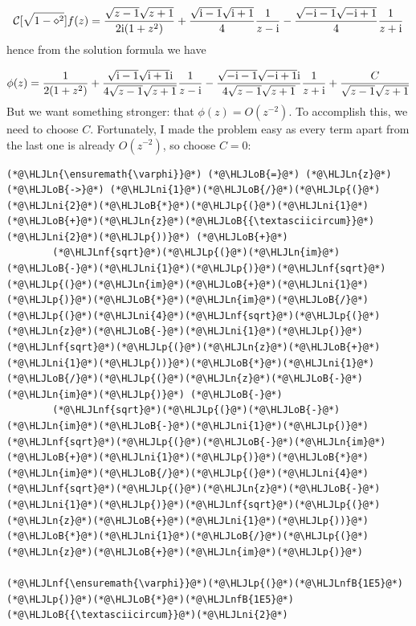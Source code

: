 \documentclass[12pt,a4paper]{article}
\newcommand{\HLJLn}[1]{#1}
\newcommand{\HLJLnf}[1]{\textcolor[RGB]{66,102,213}{#1}}
\newcommand{\HLJLnfB}[1]{\textcolor[RGB]{59,151,46}{#1}}
\newcommand{\HLJLni}[1]{\textcolor[RGB]{59,151,46}{#1}}
\newcommand{\HLJLoB}[1]{\textcolor[RGB]{102,102,102}{\textbf{#1}}}
\newcommand{\HLJLp}[1]{#1}
\def\I{ {\rm i} }
\def\CC{ {\cal C} }
\begin{document}
\[
\CC[\sqrt{1-\diamond^2}] f(z) = {\sqrt{z-1} \sqrt{z+1}  \over 2\I(1 + z^2)}  + {\sqrt{\I -1} \sqrt{\I+1} \over 4} { 1 \over z - \I} - {\sqrt{-\I -1} \sqrt{-\I+1} \over 4} { 1 \over z + \I}
\]
hence from the solution formula we have

\[
\phi(z) = {1  \over 2(1 + z^2)}  + {\sqrt{\I -1} \sqrt{\I+1} \I \over 4\sqrt{z-1} \sqrt{z+1}} { 1 \over z - \I} - {\sqrt{-\I -1} \sqrt{-\I+1} \I \over 4\sqrt{z-1} \sqrt{z+1}} { 1 \over z + \I} + {C \over \sqrt{z-1} \sqrt{z+1}}
\]
But we want something stronger: that $\phi(z) = O(z^{-2})$. To accomplish this, we need to choose $C$.  Fortunately, I made the problem easy as every term apart from the last one is already $O(z^{-2})$, so choose $C = 0$:


\begin{lstlisting}
(*@\HLJLn{\ensuremath{\varphi}}@*) (*@\HLJLoB{=}@*) (*@\HLJLn{z}@*) (*@\HLJLoB{->}@*) (*@\HLJLni{1}@*)(*@\HLJLoB{/}@*)(*@\HLJLp{(}@*)(*@\HLJLni{2}@*)(*@\HLJLoB{*}@*)(*@\HLJLp{(}@*)(*@\HLJLni{1}@*)(*@\HLJLoB{+}@*)(*@\HLJLn{z}@*)(*@\HLJLoB{{\textasciicircum}}@*)(*@\HLJLni{2}@*)(*@\HLJLp{))}@*) (*@\HLJLoB{+}@*) 
        (*@\HLJLnf{sqrt}@*)(*@\HLJLp{(}@*)(*@\HLJLn{im}@*)(*@\HLJLoB{-}@*)(*@\HLJLni{1}@*)(*@\HLJLp{)}@*)(*@\HLJLnf{sqrt}@*)(*@\HLJLp{(}@*)(*@\HLJLn{im}@*)(*@\HLJLoB{+}@*)(*@\HLJLni{1}@*)(*@\HLJLp{)}@*)(*@\HLJLoB{*}@*)(*@\HLJLn{im}@*)(*@\HLJLoB{/}@*)(*@\HLJLp{(}@*)(*@\HLJLni{4}@*)(*@\HLJLnf{sqrt}@*)(*@\HLJLp{(}@*)(*@\HLJLn{z}@*)(*@\HLJLoB{-}@*)(*@\HLJLni{1}@*)(*@\HLJLp{)}@*)(*@\HLJLnf{sqrt}@*)(*@\HLJLp{(}@*)(*@\HLJLn{z}@*)(*@\HLJLoB{+}@*)(*@\HLJLni{1}@*)(*@\HLJLp{))}@*)(*@\HLJLoB{*}@*)(*@\HLJLni{1}@*)(*@\HLJLoB{/}@*)(*@\HLJLp{(}@*)(*@\HLJLn{z}@*)(*@\HLJLoB{-}@*)(*@\HLJLn{im}@*)(*@\HLJLp{)}@*) (*@\HLJLoB{-}@*) 
        (*@\HLJLnf{sqrt}@*)(*@\HLJLp{(}@*)(*@\HLJLoB{-}@*)(*@\HLJLn{im}@*)(*@\HLJLoB{-}@*)(*@\HLJLni{1}@*)(*@\HLJLp{)}@*)(*@\HLJLnf{sqrt}@*)(*@\HLJLp{(}@*)(*@\HLJLoB{-}@*)(*@\HLJLn{im}@*)(*@\HLJLoB{+}@*)(*@\HLJLni{1}@*)(*@\HLJLp{)}@*)(*@\HLJLoB{*}@*)(*@\HLJLn{im}@*)(*@\HLJLoB{/}@*)(*@\HLJLp{(}@*)(*@\HLJLni{4}@*)(*@\HLJLnf{sqrt}@*)(*@\HLJLp{(}@*)(*@\HLJLn{z}@*)(*@\HLJLoB{-}@*)(*@\HLJLni{1}@*)(*@\HLJLp{)}@*)(*@\HLJLnf{sqrt}@*)(*@\HLJLp{(}@*)(*@\HLJLn{z}@*)(*@\HLJLoB{+}@*)(*@\HLJLni{1}@*)(*@\HLJLp{))}@*)(*@\HLJLoB{*}@*)(*@\HLJLni{1}@*)(*@\HLJLoB{/}@*)(*@\HLJLp{(}@*)(*@\HLJLn{z}@*)(*@\HLJLoB{+}@*)(*@\HLJLn{im}@*)(*@\HLJLp{)}@*)

(*@\HLJLnf{\ensuremath{\varphi}}@*)(*@\HLJLp{(}@*)(*@\HLJLnfB{1E5}@*)(*@\HLJLp{)}@*)(*@\HLJLoB{*}@*)(*@\HLJLnfB{1E5}@*)(*@\HLJLoB{{\textasciicircum}}@*)(*@\HLJLni{2}@*)
\end{lstlisting}
\end{document}
